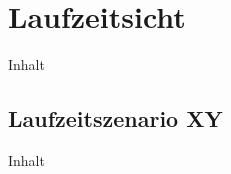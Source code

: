\chapter{Laufzeitsicht\label{chap6:Sechstes-Kapitel}}

Inhalt

\section{Laufzeitszenario XY\label{sec6.1:Unterpunkt-1}}

Inhalt